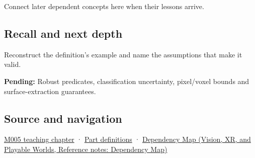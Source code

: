 \hypertarget{appendix-c80db39080be-used-by}{}

Connect later dependent concepts here when their lessons arrive.

\subsection{Recall and next depth}\label{appendix-c80db39080be-recall-and-next-depth}

\hypertarget{appendix-c80db39080be-recall-and-next-depth}{}

Reconstruct the definition's example and name the assumptions that make it valid.

\textbf{Pending:} Robust predicates, classification uncertainty, pixel/voxel bounds and surface-extraction guarantees.

\subsection{Source and navigation}\label{appendix-c80db39080be-source-and-navigation}

\hypertarget{appendix-c80db39080be-source-and-navigation}{}

\hyperref[01-foundations-i-ch001-when-arithmetic-meets-uncertainty]{M005 teaching chapter} · \hyperref[appendix-fd090d982a15-m005---parts-77-88]{Part definitions} · \href{../07-Vision-XR-and-Playable-Worlds/main.pdf\#nameddest=appendix-4ad47bdd269a}{Dependency Map (Vision, XR, and Playable Worlds, Reference notes: Dependency Map)}
